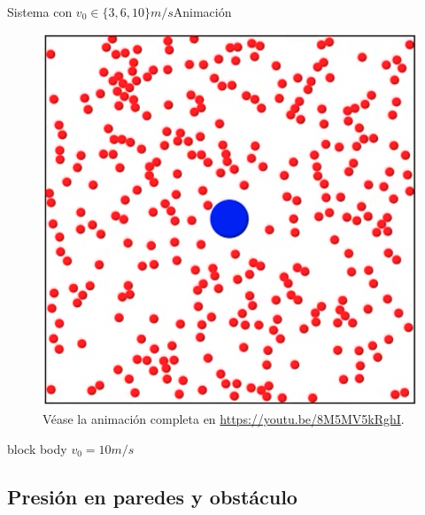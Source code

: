 \documentclass{beamer}
\begin{document}
\begin{frame}{Sistema con $v_0 \in \{ 3, 6, 10\}m/s$}{Animación}
\begin{minipage}[t]{0.30\textwidth}
\begin{figure}[H!]
                        \includegraphics[width=\textwidth]{./animation_obstacle_still_v_10}
                        \caption*{Véase la animación completa en \url{https://youtu.be/8M5MV5kRghI}.}
                        \label{fig:a_4}
                    \end{figure}
                    \begin{beamercolorbox}[sep=5pt,center]{block body}
                        \centering
                        \small{$v_0=10m/s$}
                    \end{beamercolorbox}
                \end{minipage}
            \end{frame}

        \subsection{Presión en paredes y obstáculo}
\end{document}
